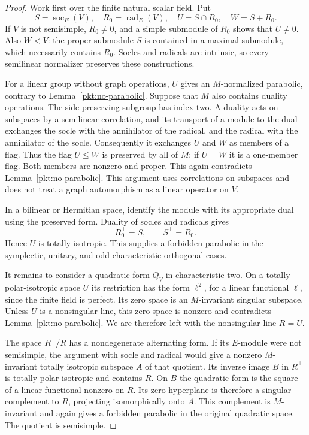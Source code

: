 \begin{proof}
Work first over the finite natural scalar field.  Put
\[
 S=\operatorname{soc}_E(V),\quad
 R_0=\operatorname{rad}_E(V),\quad
 U=S\cap R_0,\quad W=S+R_0.
\]
If $V$ is not semisimple, $R_0\ne0$, and a simple submodule of
$R_0$ shows that $U\ne0$.  Also $W<V$: the proper submodule $S$
is contained in a maximal submodule, which necessarily contains
$R_0$.  Socles and radicals are intrinsic, so every semilinear
normalizer preserves these constructions.

For a linear group without graph operations, $U$ gives an
$M$-normalized parabolic, contrary to
Lemma~\ref{pkt:no-parabolic}.  Suppose that $M$ also contains
duality operations.  The side-preserving subgroup has index two.
A duality acts on subspaces by a semilinear correlation, and its
transport of a module to the dual exchanges the socle with the
annihilator of the radical, and the radical with the annihilator
of the socle.  Consequently it exchanges $U$ and $W$ as members
of a flag.  Thus the flag $U\le W$ is preserved by all of $M$;
if $U=W$ it is a one-member flag.  Both members are nonzero and
proper.  This again contradicts Lemma~\ref{pkt:no-parabolic}.
This argument uses correlations on subspaces and does not treat a
graph automorphism as a linear operator on $V$.

In a bilinear or Hermitian space, identify the module with its
appropriate dual using the preserved form.  Duality of socles
and radicals gives
\[
                       R_0^\perp=S,\qquad S^\perp=R_0.
\]
Hence $U$ is totally isotropic.  This supplies a forbidden
parabolic in the symplectic, unitary, and odd-characteristic
orthogonal cases.

It remains to consider a quadratic form $Q_V$ in characteristic
two.  On a totally polar-isotropic space $U$ its restriction has
the form $\ell^2$, for a linear functional $\ell$, since the
finite field is perfect.  Its zero space is an $M$-invariant
singular subspace.  Unless $U$ is a nonsingular line, this zero
space is nonzero and contradicts
Lemma~\ref{pkt:no-parabolic}.  We are therefore left with the
nonsingular line $R=U$.

The space $R^\perp/R$ has a nondegenerate alternating form.
If its $E$-module were not semisimple, the argument with socle
and radical would give a nonzero $M$-invariant totally isotropic
subspace $A$ of that quotient.  Its inverse image $B$ in
$R^\perp$ is totally polar-isotropic and contains $R$.  On $B$
the quadratic form is the square of a linear functional nonzero
on $R$.  Its zero hyperplane is therefore a singular complement
to $R$, projecting isomorphically onto $A$.  This complement is
$M$-invariant and again gives a forbidden parabolic in the
original quadratic space.  The quotient is semisimple.


\end{proof}
